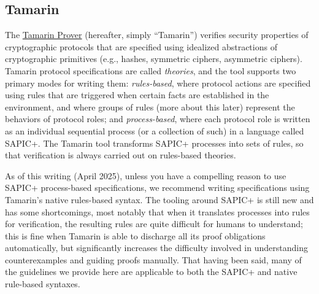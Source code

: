 



\lstset{style=custom-tamarin, upquote=true}

\subsection{Tamarin}

The \href{https://tamarin-prover.com/}{Tamarin Prover} (hereafter, simply ``Tamarin'') verifies security properties of cryptographic protocols that are specified using idealized abstractions of cryptographic primitives (e.g., hashes, symmetric ciphers, asymmetric ciphers). Tamarin protocol specifications are called \emph{theories}, and the tool supports two primary modes for writing them: \emph{rules-based}, where protocol actions are specified using rules that are triggered when certain facts are established in the environment, and where groups of rules (more about this later) represent the behaviors of protocol roles; and \emph{process-based}, where each protocol role is written as an individual sequential process (or a collection of such) in a language called SAPIC+. The Tamarin tool transforms SAPIC+ processes into sets of rules, so that verification is always carried out on rules-based theories. 

As of this writing (April 2025), unless you have a compelling reason to use SAPIC+ process-based specifications, we recommend writing specifications using Tamarin's native rules-based syntax. The tooling around SAPIC+ is still new and has some shortcomings, most notably that when it translates processes into rules for verification, the resulting rules are quite difficult for humans to understand; this is fine when Tamarin is able to discharge all its proof obligations automatically, but significantly increases the difficulty involved in understanding counterexamples and guiding proofs manually. That having been said, many of the guidelines we provide here are applicable to both the SAPIC+ and native rule-based syntaxes.

